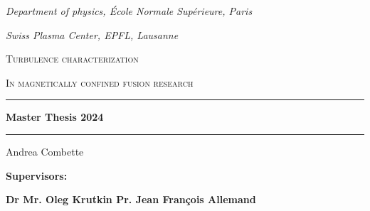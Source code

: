 \documentclass[11pt,a4paper]{report}
\author{Andrea}
\begin{document}
\begin{titlepage}
    \begin{center}
        \vspace*{2cm}
        \emph{\footnotesize{Department of physics, École Normale Supérieure, Paris}}

        \emph{\footnotesize{Swiss Plasma Center, EPFL, Lausanne}}


        \vspace*{1cm}

        \textsc{Turbulence characterization}

        \textsc{In magnetically confined fusion research}
        \vspace*{1cm}

        \rule{14cm}{2pt}\vspace{.7cm}

        \Large{\textbf{Master Thesis 2024}}

        \vspace{.5cm}
        \rule{14cm}{2pt}
        \vspace{1cm}

        \Large Andrea Combette

        \vspace{3cm}

        \raisebox{-5pt}{\quad\decofourleft\decotwo\decofourright\quad}

        \vspace{2cm}
        \vspace{1cm}

        \begin{minipage}{14cm}
            \small{\textbf{Supervisors:}}
            \vspace{.5cm}

            \small{\textbf{Dr Mr. Oleg Krutkin \null\hfill Pr. Jean François Allemand}}

        \end{minipage}
        \vspace{2cm}



\end{center}
\end{titlepage}
\end{document}
